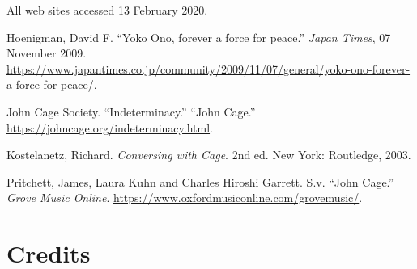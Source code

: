 All web sites accessed 13 February 2020.

\begin{mybiblist}


\item Hoenigman, David F.  ``Yoko Ono, forever a force for peace.'' \textit{Japan Times}, 07 November 2009. \url{https://www.japantimes.co.jp/community/2009/11/07/general/yoko-ono-forever-a-force-for-peace/}.

\item John Cage Society.  ``Indeterminacy.''  ``John Cage.'' \url{https://johncage.org/indeterminacy.html}.

\item Kostelanetz, Richard.  \textit{Conversing with Cage}.  2nd ed.  New York: Routledge, 2003.


\item Pritchett, James, Laura Kuhn and Charles Hiroshi Garrett.  S.v. ``John Cage.''  \textit{Grove Music Online}. \url{https://www.oxfordmusiconline.com/grovemusic/}.





\end{mybiblist}

\newpage

\section{Credits}

